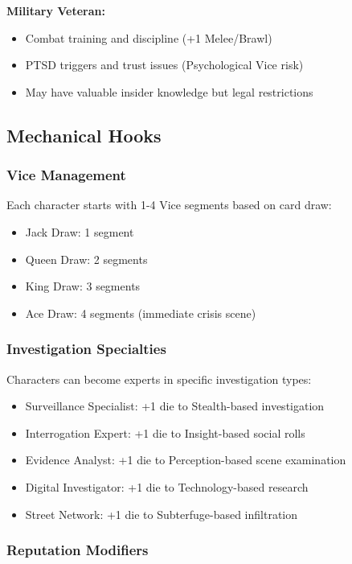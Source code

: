 \documentclass[11pt]{article}
\begin{document}
\textbf{Military Veteran:}
\begin{itemize}
\item Combat training and discipline (+1 Melee/Brawl)
\item PTSD triggers and trust issues (Psychological Vice risk)
\item May have valuable insider knowledge but legal restrictions
\end{itemize}

\subsection{Mechanical Hooks}

\subsubsection{Vice Management}

Each character starts with 1-4 Vice segments based on card draw:
\begin{itemize}
\item Jack Draw: 1 segment
\item Queen Draw: 2 segments
\item King Draw: 3 segments  
\item Ace Draw: 4 segments (immediate crisis scene)
\end{itemize}

\subsubsection{Investigation Specialties}

Characters can become experts in specific investigation types:
\begin{itemize}
\item Surveillance Specialist: +1 die to Stealth-based investigation
\item Interrogation Expert: +1 die to Insight-based social rolls
\item Evidence Analyst: +1 die to Perception-based scene examination
\item Digital Investigator: +1 die to Technology-based research
\item Street Network: +1 die to Subterfuge-based infiltration
\end{itemize}

\subsubsection{Reputation Modifiers}
\end{document}
